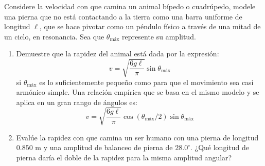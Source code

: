 \item Considere la velocidad con que camina un animal bípedo o cuadrúpedo, modele una pierna que no está contactando a la tierra como una barra uniforme de longitud $\ell$, que se hace pivotar como un péndulo físico a través de una mitad de un ciclo, en resonancia. Sea que $\theta_{\text{máx}}$ represente su amplitud.
\begin{enumerate}
    \item Demuestre que la rapidez del animal está dada por la expresión:
    $$ v = \sqrt{\frac{6g\ell}{\pi}} \sin\theta_{\text{máx}} $$
    si $\theta_{\text{máx}}$ es lo suficientemente pequeño como para que el movimiento sea casi armónico simple. Una relación empírica que se basa en el mismo modelo y se aplica en un gran rango de ángulos es:
    $$ v = \sqrt{\frac{6g\ell}{\pi}} \cos(\theta_{\text{máx}}/2) \sin\theta_{\text{máx}} $$
    \item Evalúe la rapidez con que camina un ser humano con una pierna de longitud $0.850\text{ m}$ y una amplitud de balanceo de pierna de $28.0^\circ$. ¿Qué longitud de pierna daría el doble de la rapidez para la misma amplitud angular?
\end{enumerate}